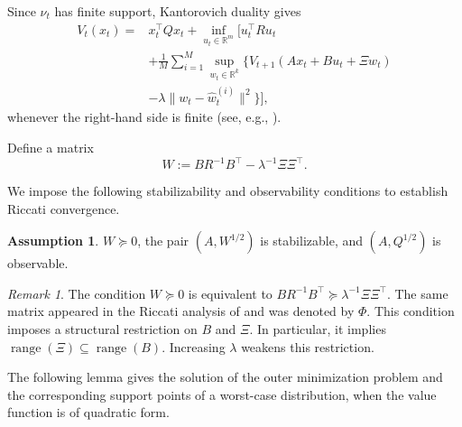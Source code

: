 \documentclass[10pt,journal,twoside]{IEEEtran}
\theoremstyle{definition}
\newtheorem{assumption}{Assumption}
\theoremstyle{remark}
\newtheorem{remark}{Remark}
\newcommand{\R}{\mathbb{R}}
\begin{document}
Since \(\nu_t\) has finite support, Kantorovich duality gives
\begin{equation}
	\begin{aligned}
		V_t(x_t)
		=&
		x_t^\top Qx_t+
		\inf_{u_t\in\R^m}
		\Bigg[
		u_t^\top Ru_t                                    \\
		&+
		\frac1M\sum_{i=1}^M
		\sup_{w_t\in\R^k}
		\Big\{
		V_{t+1}(Ax_t+Bu_t+\Xi w_t)\\
        & -\lambda\|w_t-\widehat  w_t^{(i)}\|^2 \Big\}
		\Bigg],
	\end{aligned}
	\label{eq:Bellman-finite-support}
\end{equation}
whenever the right-hand side is finite (see, e.g.,
\cite{Villani2009,BlanchetMurthy2019,MohajerinEsfahaniKuhn2018,GaoKleywegt2023}).








Define a matrix
\begin{equation}
	W:=BR^{-1}B^\top-\lambda^{-1}\Xi\Xi^\top .
	\label{eq:W-def-bellman}
\end{equation}


We impose the following stabilizability and observability conditions to establish Riccati convergence.

\begin{assumption}
	\label{ass:psd-W}
	$W\succeq0$, the pair \((A,W^{1/2})\) is stabilizable, and $(A,Q^{1/2})$ is observable.
\end{assumption}

\begin{remark}
    The condition \(W\succeq0\) is equivalent to $BR^{-1}B^\top\succeq \lambda^{-1}\Xi\Xi^\top$. The same matrix appeared in the Riccati analysis of \cite{KimYang2023} and was denoted by \(\Phi\). This condition imposes a structural restriction on \(B\) and \(\Xi\). In particular, it implies \(\operatorname{range}(\Xi)\subseteq \operatorname{range}(B).\) Increasing \(\lambda\) weakens this restriction.
\end{remark}




The following lemma gives the solution of the outer minimization problem and the corresponding support points of a worst-case distribution, when the value function is of quadratic form.
\end{document}
